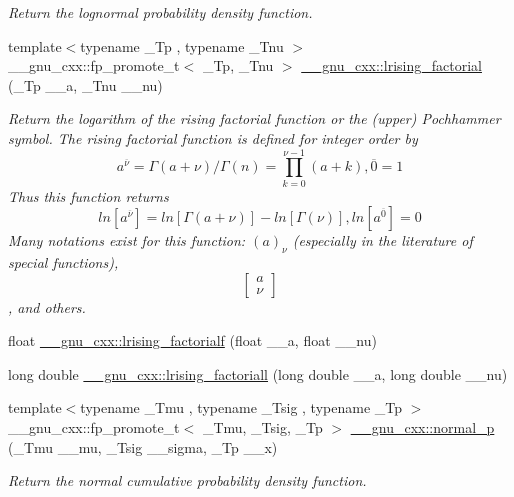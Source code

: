 \begin{DoxyCompactItemize}
\begin{DoxyCompactList}\small\item\em Return the lognormal probability density function. \end{DoxyCompactList}\item 
{\footnotesize template$<$typename \+\_\+\+Tp , typename \+\_\+\+Tnu $>$ }\\\+\_\+\+\_\+gnu\+\_\+cxx\+::fp\+\_\+promote\+\_\+t$<$ \+\_\+\+Tp, \+\_\+\+Tnu $>$ \hyperlink{group__gnu__math__spec__func_ga8912b75b2f7592fb61128c766e7313b9}{\+\_\+\+\_\+gnu\+\_\+cxx\+::lrising\+\_\+factorial} (\+\_\+\+Tp \+\_\+\+\_\+a, \+\_\+\+Tnu \+\_\+\+\_\+nu)
\begin{DoxyCompactList}\small\item\em Return the logarithm of the rising factorial function or the (upper) Pochhammer symbol. The rising factorial function is defined for integer order by \[ a^{\overline{\nu}} = \Gamma(a + \nu) / \Gamma(n) = \prod_{k=0}^{\nu-1} (a + k), \overline{0} = 1 \] Thus this function returns \[ ln[a^{\overline{\nu}}] = ln[\Gamma(a + \nu)] - ln[\Gamma(\nu)], ln[a^{\overline{0}}] = 0 \] Many notations exist for this function\+: $ (a)_\nu $ (especially in the literature of special functions), \[ \left[ \begin{array}{c} a \\ \nu \end{array} \right] \], and others. \end{DoxyCompactList}\item 
float \hyperlink{group__gnu__math__spec__func_ga68c64f4e44d03b5b3f75f90dbe2e0819}{\+\_\+\+\_\+gnu\+\_\+cxx\+::lrising\+\_\+factorialf} (float \+\_\+\+\_\+a, float \+\_\+\+\_\+nu)
\item 
long double \hyperlink{group__gnu__math__spec__func_ga1ac811f56f38f7ea7a1e035ec0157f6b}{\+\_\+\+\_\+gnu\+\_\+cxx\+::lrising\+\_\+factoriall} (long double \+\_\+\+\_\+a, long double \+\_\+\+\_\+nu)
\item 
{\footnotesize template$<$typename \+\_\+\+Tmu , typename \+\_\+\+Tsig , typename \+\_\+\+Tp $>$ }\\\+\_\+\+\_\+gnu\+\_\+cxx\+::fp\+\_\+promote\+\_\+t$<$ \+\_\+\+Tmu, \+\_\+\+Tsig, \+\_\+\+Tp $>$ \hyperlink{group__gnu__math__spec__func_gaeb735b0fb98c7684ba61b8940f50193c}{\+\_\+\+\_\+gnu\+\_\+cxx\+::normal\+\_\+p} (\+\_\+\+Tmu \+\_\+\+\_\+mu, \+\_\+\+Tsig \+\_\+\+\_\+sigma, \+\_\+\+Tp \+\_\+\+\_\+x)
\begin{DoxyCompactList}\small\item\em Return the normal cumulative probability density function. \end{DoxyCompactList}\item 

\end{DoxyCompactItemize}
